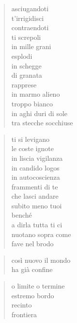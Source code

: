 \clearpage


\vspace*{2cm}

	\begin{verse}
		asciugandoti\\
		t’irrigidisci\\
		contraendoti\\
		ti screpoli\\
		in mille grani\\
		esplodi\\
		in schegge\\
		di granata\\
		rapprese\\
		in marmo alieno\\
		troppo bianco\\
		in aghi duri di sole\\
		tra stecche socchiuse
	\end{verse}

	\begin{verse}
		ti si levigano\\
		le coste ignote\\
		in liscia vigilanza\\
		in candido logos\\
		in autocoscienza\\
		frammenti di te\\
		che lasci andare\\
		subito meno tuoi\\
		benché\\
		a dirla tutta ti ci\\
		nuotano sopra come\\
		fave nel brodo
	\end{verse}

\clearpage


\vspace*{2cm}

	\begin{verse}
		così nuovo il mondo\\
		ha già confine
	\end{verse}

	\begin{verse}
		o limite o termine\\
		estremo bordo\\
		recinto\\
		frontiera
	\end{verse}

